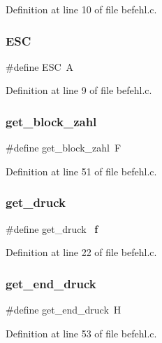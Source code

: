 Definition at line 10 of file befehl.\+c.

\mbox{\label{befehl_8c_a4af1b6159e447ba72652bb7fcdfa726e}} 
\subsubsection{E\+SC}
{\footnotesize\ttfamily \#define E\+SC~\textquotesingle{}A\textquotesingle{}}



Definition at line 9 of file befehl.\+c.

\mbox{\label{befehl_8c_a093109e50cb3890c5f0854e2d1277729}} 
\subsubsection{get\+\_\+block\+\_\+zahl}
{\footnotesize\ttfamily \#define get\+\_\+block\+\_\+zahl~\textquotesingle{}F\textquotesingle{}}



Definition at line 51 of file befehl.\+c.

\mbox{\label{befehl_8c_a350cf9b6bd1d61cbbb51bf59599885d8}} 
\subsubsection{get\+\_\+druck}
{\footnotesize\ttfamily \#define get\+\_\+druck~\textquotesingle{}\textbf{ f}\textquotesingle{}}



Definition at line 22 of file befehl.\+c.

\mbox{\label{befehl_8c_a39639decb978153b837db4b20d8b71b7}} 
\subsubsection{get\+\_\+end\+\_\+druck}
{\footnotesize\ttfamily \#define get\+\_\+end\+\_\+druck~\textquotesingle{}H\textquotesingle{}}



Definition at line 53 of file befehl.\+c.

